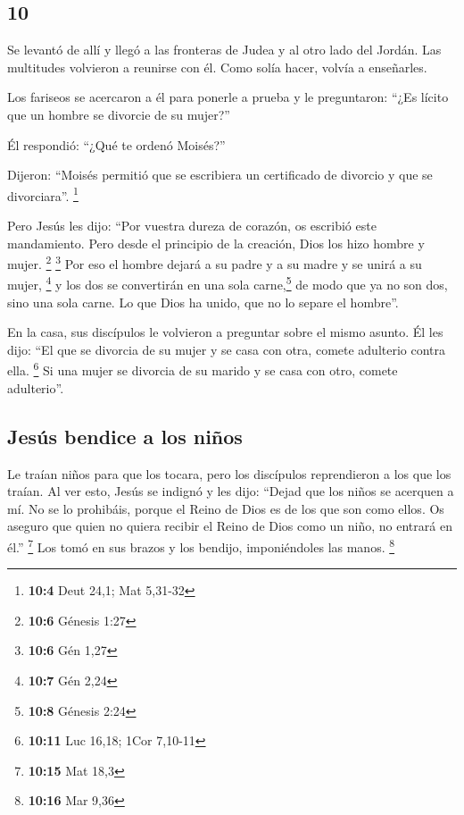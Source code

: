 \begin{paracol}{2}
\hypertarget{section-18}{%
\section{10}\label{section-18}}

 Se levantó de allí y llegó a las fronteras de Judea y al
otro lado del Jordán. Las multitudes volvieron a reunirse con él. Como
solía hacer, volvía a enseñarles.

 Los fariseos se acercaron a él para ponerle a prueba y le
preguntaron: ``¿Es lícito que un hombre se divorcie de su mujer?''

 Él respondió: ``¿Qué te ordenó Moisés?''

 Dijeron: ``Moisés permitió que se escribiera un
certificado de divorcio y que se divorciara''. \footnote{\textbf{10:4}
  Deut 24,1; Mat 5,31-32}

 Pero Jesús les dijo: ``Por vuestra dureza de corazón, os
escribió este mandamiento.  Pero desde el principio de la
creación, Dios los hizo hombre y mujer. \footnote{\textbf{10:6} Génesis
  1:27} \footnote{\textbf{10:6} Gén 1,27}  Por eso el
hombre dejará a su padre y a su madre y se unirá a su mujer, \footnote{\textbf{10:7}
  Gén 2,24}  y los dos se convertirán en una sola
carne,\footnote{\textbf{10:8} Génesis 2:24} de modo que ya no son dos,
sino una sola carne.  Lo que Dios ha unido, que no lo
separe el hombre''.

 En la casa, sus discípulos le volvieron a preguntar
sobre el mismo asunto.  Él les dijo: ``El que se divorcia
de su mujer y se casa con otra, comete adulterio contra ella.
\footnote{\textbf{10:11} Luc 16,18; 1Cor 7,10-11}  Si una
mujer se divorcia de su marido y se casa con otro, comete adulterio''.

\hypertarget{jesuxfas-bendice-a-los-niuxf1os}{%
\subsection{Jesús bendice a los
niños}\label{jesuxfas-bendice-a-los-niuxf1os}}

 Le traían niños para que los tocara, pero los discípulos
reprendieron a los que los traían.  Al ver esto, Jesús se
indignó y les dijo: ``Dejad que los niños se acerquen a mí. No se lo
prohibáis, porque el Reino de Dios es de los que son como ellos.
 Os aseguro que quien no quiera recibir el Reino de Dios
como un niño, no entrará en él.'' \footnote{\textbf{10:15} Mat 18,3}
 Los tomó en sus brazos y los bendijo, imponiéndoles las
manos. \footnote{\textbf{10:16} Mar 9,36}


\end{paracol}
